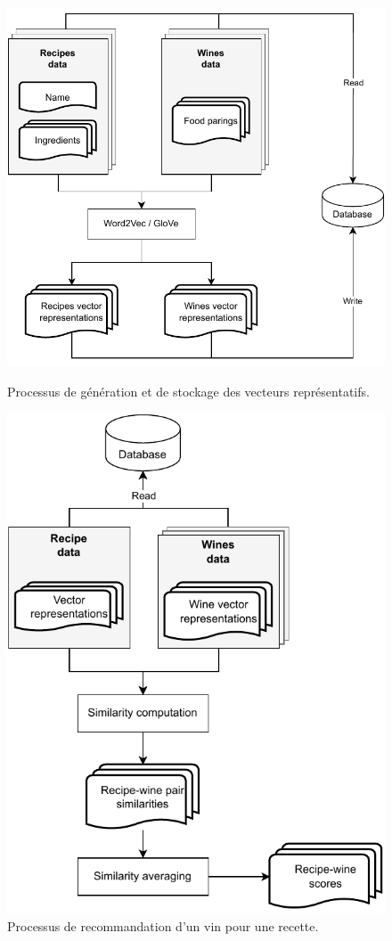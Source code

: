 \begin{figure}[H]
    \centering
    \begin{minipage}[b]{.5\textwidth}
      \centering
      \includegraphics[width=.8\linewidth]{rsc/embedding_generation.pdf}
      \caption{\centering Processus de génération et de stockage des vecteurs représentatifs.}
      \label{fig:word2vec}
    \end{minipage}%
    \begin{minipage}[b]{.5\textwidth}
      \centering
      \includegraphics[width=.8\linewidth]{rsc/similarities.pdf}
      \caption{\centering Processus de recommandation d'un vin pour une recette.}
      \label{fig:recommandation}
    \end{minipage}
    \end{figure}

